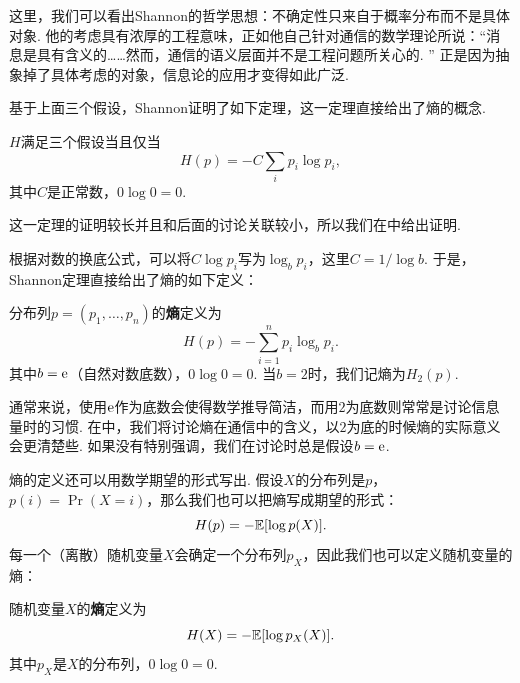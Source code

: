 这里，我们可以看出Shannon的哲学思想：不确定性只来自于概率分布而不是具体对象. 他的考虑具有浓厚的工程意味，正如他自己针对通信的数学理论所说：“消息是具有含义的……然而，通信的语义层面并不是工程问题所关心的. ”\cite{shannonMathematicalTheoryCommunication1948} 正是因为抽象掉了具体考虑的对象，信息论的应用才变得如此广泛. 

基于上面三个假设，Shannon证明了如下定理，这一定理直接给出了熵的概念.

\begin{theorem}[Shannon定理]\label{theorem:Shannon-thm}
    $H$满足三个假设当且仅当
    \[H(p)=-C\sum_{i}p_i\log p_i,\]
    其中$C$是正常数，$0\log 0=0$.
\end{theorem}
这一定理的证明较长并且和后面的讨论关联较小，所以我们在中给出证明.

根据对数的换底公式，可以将$C\log p_i$写为$\log_bp_i$，这里$C=1/\log b$. 于是，Shannon定理直接给出了熵的如下定义：
\begin{definition}[熵]
    分布列$p=(p_1,\dots,p_n)$的\textbf{熵}定义为
    \[H(p)=-\sum_{i=1}^np_i\log_b p_i.\]
    其中$b=\mathrm{e}$（自然对数底数），$0\log 0=0$. 当$b=2$时，我们记熵为$H_2(p)$.
\end{definition}

通常来说，使用$\mathrm{e}$作为底数会使得数学推导简洁，而用$2$为底数则常常是讨论信息量时的习惯. 在中，我们将讨论熵在通信中的含义，以$2$为底的时候熵的实际意义会更清楚些. 如果没有特别强调，我们在讨论时总是假设$b=\mathrm{e}$.

熵的定义还可以用数学期望的形式写出. 假设$X$的分布列是$p$，$p(i)=\Pr(X=i)$，那么我们也可以把熵写成期望的形式：
\[H(p)=-\mathbb{E}[\log p(X)].\]
每一个（离散）随机变量$X$会确定一个分布列$p_X$，因此我们也可以定义随机变量的熵：
\begin{definition}[随机变量的熵]
    随机变量$X$的\textbf{熵}定义为
    \[H(X)=-\mathbb{E}[\log p_X(X)].\]
    其中$p_X$是$X$的分布列，$0\log 0=0$.
\end{definition}

